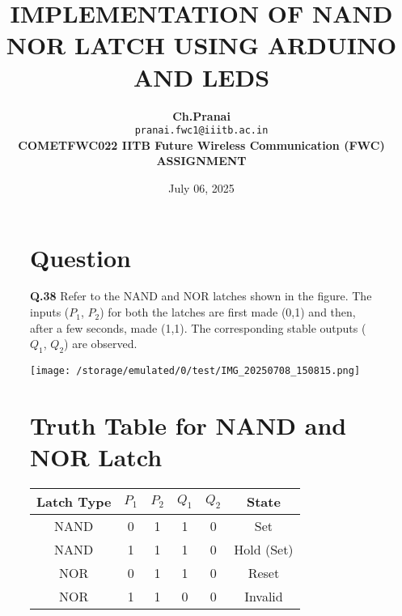 \documentclass[12pt,a4paper]{article}
\title{\textbf{IMPLEMENTATION OF NAND NOR LATCH USING ARDUINO AND LEDS}}
\author{
\begin{tabular}{c}
\hspace{-5cm}\textbf{Ch.Pranai} \\
\hspace{-5cm}\texttt{pranai.fwc1@iiitb.ac.in} \\
\textbf{\hspace{-2cm}COMETFWC022  IITB Future Wireless Communication (FWC) ASSIGNMENT}
\end{tabular}
}
\date{July 06, 2025}
\begin{document}
\maketitle


\begin{figure}[H]
  \centering
  \begin{minipage}[t]{0.48\textwidth}
    \section*{Question}
    \small
    \noindent\textbf{Q.38} \quad Refer to the NAND and NOR latches shown in the figure. The inputs ($P_1$, $P_2$) for both the latches are first made (0,1) and then, after a few seconds, made (1,1). The corresponding stable outputs ($Q_1$, $Q_2$) are observed.

    \vspace{0.3cm}
    \texttt{[image: /storage/emulated/0/test/IMG\_20250708\_150815.png]} 

    \vspace{0.5cm}
    \section*{Truth Table for NAND and NOR Latch}
    \renewcommand{\arraystretch}{1.3}
    \begin{tabular}{|c|c|c|c|c|c|}
      \hline
      \textbf{Latch Type} & \textbf{$P_1$} & \textbf{$P_2$} & \textbf{$Q_1$} & \textbf{$Q_2$} & \textbf{State} \\
      \hline
      NAND & 0 & 1 & 1 & 0 & Set \\
      NAND & 1 & 1 & 1 & 0 & Hold (Set) \\
      \hline
      NOR & 0 & 1 & 1 & 0 & Reset \\
      NOR & 1 & 1 & 0 & 0 & Invalid \\
      \hline
    \end{tabular}
  \end{minipage}\hfill
  \begin{minipage}[t]{0.48\textwidth}

\end{minipage}
\end{figure}
\end{document}
